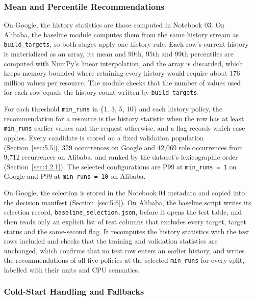 \documentclass{IEEEtran}
\begin{document}
\subsubsection{Mean and Percentile Recommendations}\label{sec:5.2.2}

On Google, the history statistics are those computed in Notebook 03. On Alibaba, the baseline module computes them from the same history stream as \texttt{build\_targets}, so both stages apply one history rule. Each row's current history is materialized as an array, its mean and 90th, 95th and 99th percentiles are computed with NumPy's linear interpolation, and the array is discarded, which keeps memory bounded where retaining every history would require about 176 million values per resource. The module checks that the number of values used for each row equals the history count written by \texttt{build\_targets}.

For each threshold \texttt{min\_runs} in \{1, 3, 5, 10\} and each history policy, the recommendation for a resource is the history statistic when the row has at least \texttt{min\_runs} earlier values and the request otherwise, and a flag records which case applies. Every candidate is scored on a fixed validation population (Section~\ref{sec:5.5}), 329 occurrences on Google and 42,069 role occurrences from 9,712 recurrences on Alibaba, and ranked by the dataset's lexicographic order (Section~\ref{sec:4.2.1}). The selected configurations are P99 at \texttt{min\_runs\ =\ 1} on Google and P99 at \texttt{min\_runs\ =\ 10} on Alibaba.

On Google, the selection is stored in the Notebook 04 metadata and copied into the decision manifest (Section~\ref{sec:5.6}). On Alibaba, the baseline script writes its selection record, \texttt{baseline\_selection.json}, before it opens the test table, and then reads only an explicit list of test columns that excludes every target, target status and the same-second flag. It recomputes the history statistics with the test rows included and checks that the training and validation statistics are unchanged, which confirms that no test row enters an earlier history, and writes the recommendations of all five policies at the selected \texttt{min\_runs} for every split, labelled with their units and CPU semantics.

\subsubsection{Cold-Start Handling and Fallbacks}\label{sec:5.2.3}
\end{document}
